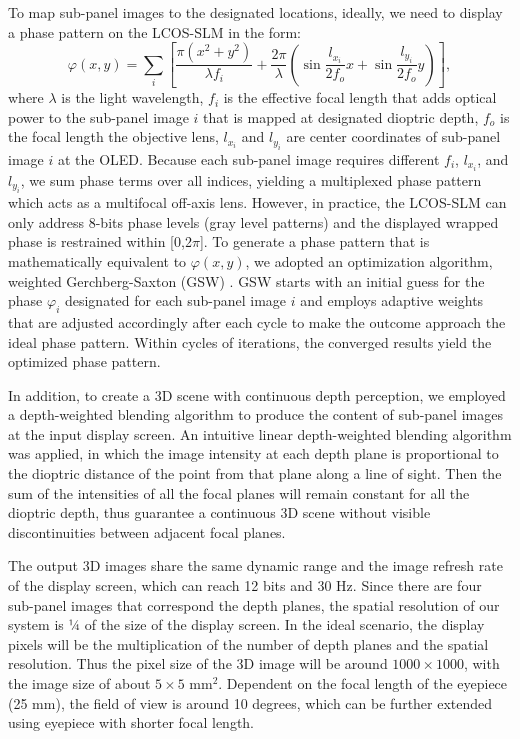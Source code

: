 \documentclass[9pt,twocolumn,twoside]{osajnl}
\begin{document}
To map sub-panel images to the designated locations, ideally, we need to display a phase pattern on the LCOS-SLM in the form:
\begin{equation}
\varphi(x,y) = \sum_{i}[ \frac{\pi (x^{2}+y^{2})}{\lambda f_{i}} + \frac{2 \pi}{\lambda}(\sin \frac{l_{x_i}}{2f_{o}}x +\sin\frac{l_{y_i}}{2f_{o}}y)],
\label{eq:1}
\end{equation}
where $\lambda$ is the light wavelength, $f_i$ is the effective focal length that adds optical power to the sub-panel image $i$ that is mapped at designated dioptric depth, $f_o$ is the focal length the objective lens, $l_{x_i}$ and $l_{y_i}$ are center coordinates of sub-panel image $i$ at the OLED.  Because each sub-panel image requires different $f_i$, $l_{x_i}$, and $l_{y_i}$, we sum phase terms over all indices, yielding a multiplexed phase pattern which acts as a multifocal off-axis lens. However, in practice, the LCOS-SLM can only address 8-bits phase levels (gray level patterns)   and the displayed wrapped phase is restrained within [0,2$\pi$]. To generate a phase pattern that is mathematically equivalent to $\varphi (x,y)$, we adopted an optimization algorithm, weighted Gerchberg-Saxton (GSW) \cite{di2007computer}. GSW starts with an initial guess for the phase $\varphi _{i}$ designated for each sub-panel image $i$ and employs adaptive weights \cite{bianchi2010real} that are adjusted accordingly after each cycle to make the outcome approach the ideal phase pattern. Within cycles of iterations, the converged results yield the optimized phase pattern.
  
In addition, to create a 3D scene with continuous depth perception, we employed a depth-weighted blending algorithm \cite{ravikumar2011creating} to produce the content of sub-panel images at the input display screen.  An intuitive linear depth-weighted blending algorithm was applied, in which the image intensity at each depth plane is proportional to the dioptric distance of the point from that plane along a line of sight. Then the sum of the intensities of all the focal planes will remain constant for all the dioptric depth, thus guarantee a continuous 3D scene without visible discontinuities between adjacent focal planes.

The output 3D images share the same dynamic range and the image refresh rate of the display screen, which can reach 12 bits and 30 Hz. Since there are four sub-panel images that correspond the depth planes, the spatial resolution of our system is ¼ of the size of the display screen. In the ideal scenario, the display pixels will be the multiplication of the number of depth planes and the spatial resolution. Thus the pixel size of the 3D image will be around $1000\times1000$, with the image size of about $5\times5$ mm$^2$. Dependent on the focal length of the eyepiece (25 mm), the field of view is around 10 degrees, which can be further extended using eyepiece with shorter focal length.
\end{document}

